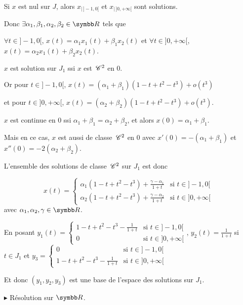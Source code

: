 \begin{exemple}
    Si $x$ est nul sur $J$, alors $x_{|\,]-1, 0[}$ et $x_{|\,]0, +\infty[}$ sont solutions. 

    Donc $\exists \alpha_1, \beta_1, \alpha_2, \beta_2 \in \R$ tels que

    $\forall t \in ]-1, 0[$, $x(t) = \alpha_1 x_1(t) + \beta_1 x_2(t)$ et
    $\forall t \in ]0, +\infty[$, $x(t) = \alpha_2 x_1(t) + \beta_2 x_2(t)$.

    $x$ est solution sur $J_1$ ssi $x$ est $\,\mathscr C^{2}$ en $0$.

    Or pour $t \in ] -1, 0[$, $x(t) = (\alpha_1 + \beta_1)(1 - t + t^2 - t^3) + o(t^3)$ 

    et pour $t \in ]0, +\infty[$, $x(t) = (\alpha_2 + \beta_2)(1 - t + t^2 - t^3) + o(t^3)$.

    $x$ est continue en $0$ ssi $\alpha_1 + \beta_1 = \alpha_2 + \beta_2$, et alors 
    $x(0) = \alpha_1 + \beta_1$.

    Mais en ce cas, $x$ est aussi de classe $\,\mathscr C^{2}$ en $0$ avec $x'(0) = -(\alpha_1 + \beta_1)$ et \\
    $x''(0) = -2(\alpha_2 + \beta_2)$.

    L'ensemble des solutions de classe $\,\mathscr C^{2}$ sur $J_1$ est donc

    $$x(t) = \begin{cases}
        \alpha_1 (1 - t + t^2 - t^3) + \frac{\gamma - \alpha_1} {1 + t} & \text{si } t \in ]-1, 0[ \\
        \alpha_2 (1 - t + t^2 - t^3) + \frac{\gamma - \alpha_2} {1 + t} & \text{si } t \in ]0, +\infty[
    \end{cases}$$ avec 
    $\alpha_1, \alpha_2, \gamma \in \R$.

    En posant $y_1(t) = \begin{cases}
        1 - t + t^2 - t^3 - \frac 1 {1 + t} & \text{si } t \in ]-1, 0[ \\
        0 & \text{si } t \in ]0, +\infty[
    \end{cases}$, $y_2(t) = \frac 1 {1 + t}$ si $t \in J_1$ et 
    $y_3 = \begin{cases}
        0 & \text{si } t \in ]-1, 0[ \\
        1 - t + t^2 - t^3 - \frac 1 {1 + t} & \text{si } t \in ]0, +\infty[
    \end{cases}$

    Et donc $(y_1, y_2, y_3)$ est une base de l'espace des solutions sur 
    $J_1$.

    \lvspace $\blacktriangleright$ Résolution sur $\R$. 


\end{exemple}
